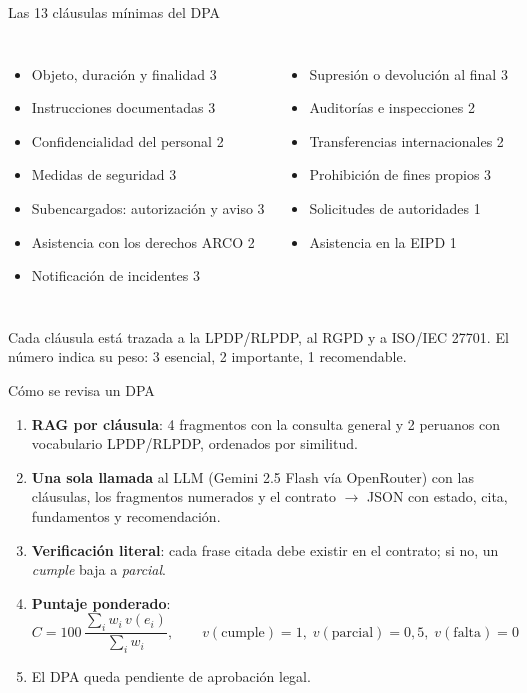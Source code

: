\documentclass[aspectratio=169,10pt]{beamer}
\begin{document}
\begin{frame}{Las 13 cláusulas mínimas del DPA}
\small
\begin{columns}[T]
\begin{itemize}
  \item Objeto, duración y finalidad \hfill \alert{3}
  \item Instrucciones documentadas \hfill \alert{3}
  \item Confidencialidad del personal \hfill 2
  \item Medidas de seguridad \hfill \alert{3}
  \item Subencargados: autorización y aviso \hfill \alert{3}
  \item Asistencia con los derechos ARCO \hfill 2
  \item Notificación de incidentes \hfill \alert{3}
\end{itemize}
\begin{itemize}
  \item Supresión o devolución al final \hfill \alert{3}
  \item Auditorías e inspecciones \hfill 2
  \item Transferencias internacionales \hfill 2
  \item Prohibición de fines propios \hfill \alert{3}
  \item Solicitudes de autoridades \hfill 1
  \item Asistencia en la EIPD \hfill 1
\end{itemize}
\end{columns}
\vspace{6pt}
\footnotesize Cada cláusula está trazada a la LPDP/RLPDP, al RGPD y a ISO/IEC 27701. El número indica su peso: 3 esencial, 2 importante, 1 recomendable.
\end{frame}

\begin{frame}{Cómo se revisa un DPA}
\begin{enumerate}
  \item \textbf{RAG por cláusula}: 4 fragmentos con la consulta general y 2 peruanos con vocabulario LPDP/RLPDP, ordenados por similitud.
  \item \textbf{Una sola llamada} al LLM (Gemini 2.5 Flash vía OpenRouter) con las cláusulas, los fragmentos numerados y el contrato $\rightarrow$ JSON con estado, cita, fundamentos y recomendación.
  \item \textbf{Verificación literal}: cada frase citada debe existir en el contrato; si no, un \emph{cumple} baja a \emph{parcial}.
  \item \textbf{Puntaje ponderado}:
  \[ C = 100\,\frac{\sum_i w_i\,v(e_i)}{\sum_i w_i}, \qquad v(\text{cumple})=1,\; v(\text{parcial})=0{,}5,\; v(\text{falta})=0 \]
  \item El DPA queda \alert{pendiente de aprobación legal}.
\end{enumerate}
\end{frame}
\end{document}
